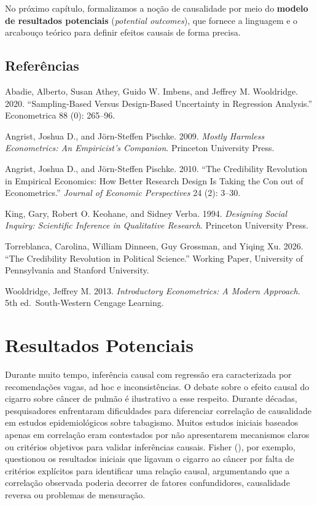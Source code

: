 \documentclass[
]{article}
\begin{document}
No próximo capítulo, formalizamos a noção de causalidade por meio do \textbf{modelo de resultados potenciais} (\emph{potential outcomes}), que fornece a linguagem e o arcabouço teórico para definir efeitos causais de forma precisa.

\subsection{Referências}\label{referuxeancias}

Abadie, Alberto, Susan Athey, Guido W. Imbens, and Jeffrey M. Wooldridge. 2020. ``Sampling-Based Versus Design-Based Uncertainty in Regression Analysis.'' Econometrica 88 (0): 265--96.

Angrist, Joshua D., and Jörn-Steffen Pischke. 2009. \emph{Mostly Harmless Econometrics: An Empiricist's Companion}. Princeton University Press.

Angrist, Joshua D., and Jörn-Steffen Pischke. 2010. ``The Credibility Revolution in Empirical Economics: How Better Research Design Is Taking the Con out of Econometrics.'' \emph{Journal of Economic Perspectives} 24 (2): 3--30.

King, Gary, Robert O. Keohane, and Sidney Verba. 1994. \emph{Designing Social Inquiry: Scientific Inference in Qualitative Research}. Princeton University Press.

Torreblanca, Carolina, William Dinneen, Guy Grossman, and Yiqing Xu. 2026. ``The Credibility Revolution in Political Science.'' Working Paper, University of Pennsylvania and Stanford University.

Wooldridge, Jeffrey M. 2013. \emph{Introductory Econometrics: A Modern Approach}. 5th ed.~South-Western Cengage Learning.

\section{Resultados Potenciais}\label{resultados-potenciais}

Durante muito tempo, inferência causal com regressão era caracterizada por recomendações vagas, ad hoc e inconsistências. O debate sobre o efeito causal do cigarro sobre câncer de pulmão é ilustrativo a esse respeito. Durante décadas, pesquisadores enfrentaram dificuldades para diferenciar correlação de causalidade em estudos epidemiológicos sobre tabagismo. Muitos estudos iniciais baseados apenas em correlação eram contestados por não apresentarem mecanismos claros ou critérios objetivos para validar inferências causais. Fisher (), por exemplo, questionou os resultados iniciais que ligavam o cigarro ao câncer por falta de critérios explícitos para identificar uma relação causal, argumentando que a correlação observada poderia decorrer de fatores confundidores, causalidade reversa ou problemas de mensuração.
\end{document}
